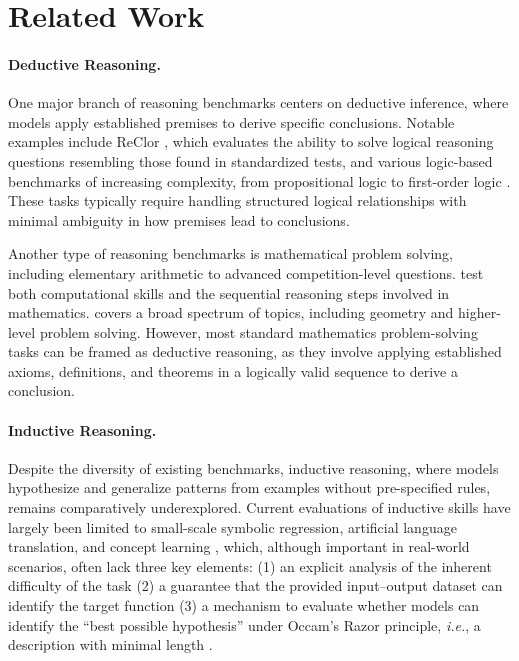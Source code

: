 
\section{Related Work}


\paragraph{Deductive Reasoning.} One major branch of reasoning benchmarks centers on deductive inference, where models apply established premises to derive specific conclusions. Notable examples include ReClor \citep{yu2020reclor}, which evaluates the ability to solve logical reasoning questions resembling those found in standardized tests, and various logic-based benchmarks of increasing complexity, from propositional logic to first-order logic \citep{han2022folio, parmar2024logicbench, zhu2023dyval, hua2024disentangling}. These tasks typically require handling structured logical relationships with minimal ambiguity in how premises lead to conclusions.

Another type of reasoning benchmarks is mathematical problem solving, including elementary arithmetic to advanced competition-level questions.  \citet{hendrycks2021measuring} test both computational skills and the sequential reasoning steps involved in mathematics. \citet{cobbe2021training} covers a broad spectrum of topics, including geometry and higher-level problem solving. However, most standard mathematics problem-solving tasks can be framed as deductive reasoning, as they involve applying established axioms, definitions, and theorems in a logically valid sequence to derive a conclusion. 

\paragraph{Inductive Reasoning.} Despite the diversity of existing benchmarks, inductive reasoning, where models hypothesize and generalize patterns from examples without pre-specified rules, remains comparatively underexplored. Current evaluations of inductive skills have largely been limited to small-scale symbolic regression, artificial language translation, and concept learning \citep{liu2024incomplete, lake2019human, qiu2023phenomenal}, which, although important in real-world scenarios, often lack three key elements: (1) an explicit analysis of the inherent difficulty of the task (2) a guarantee that the provided input–output dataset can identify the target function (3) a mechanism to evaluate whether models can identify the ``best possible hypothesis'' under Occam's Razor \citep{blumer1987occam, baker2007occam} principle, \emph{i.e.}, a description with minimal length \citep{hansen2001model, grunwald2007minimum}.

